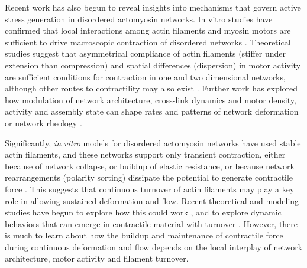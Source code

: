 \documentclass[10pt,letterpaper]{article}
\begin{document}
Recent work has also begun to reveal insights into mechanisms that govern active stress generation in disordered actomyosin networks. In vitro studies have confirmed that local interactions among actin filaments and myosin motors are sufficient to drive macroscopic contraction of disordered networks \cite{rheo_2D1}.  Theoretical studies suggest that asymmetrical compliance of actin filaments (stiffer under extension than compression) and spatial differences (dispersion) in motor activity are sufficient conditions for contraction in one \cite{1367-2630-14-3-033037} and two \cite{PhysRevX.4.041002} dimensional networks, although other routes to contractility may also exist \cite{PhysRevX.4.041002}.  Further work has explored how modulation of network architecture, cross-link dynamics and motor density, activity and assembly state can shape rates and patterns of network deformation \cite{10.1371/journal.pone.0039869,Alvarado:2013aa,C0SM00494D} or network rheology \cite{0295-5075-85-1-18007,rheo_active}.  

Significantly, {\em in vitro} models for disordered actomyosin networks have used stable actin filaments, and these networks support only transient contraction, either because of network collapse\cite{Alvarado:2013aa}, or buildup of elastic resistance\cite{Murrell15062014}, or because network rearrangements (polarity sorting) dissipate the potential to generate contractile force \cite{Ndlec:1997aa,Surrey1167}. This suggests that continuous turnover of actin filaments may play a key role in allowing sustained deformation and flow. Recent theoretical and modeling studies have begun to explore how this could work \cite{2015arXiv150706182H,Mak:2016aa,10.1371/journal.pone.0000696}, and to explore dynamic behaviors that can emerge in contractile material with turnover \cite{PhysRevLett.113.148102}. However, there is much to learn about how the buildup and maintenance of contractile force during continuous deformation and flow depends on the local interplay of network architecture, motor activity and filament turnover.
\end{document}
